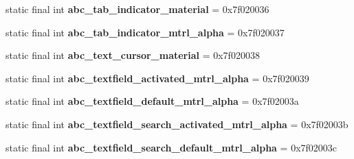 \begin{DoxyCompactItemize}
\item 
\hypertarget{classandroid_1_1support_1_1v7_1_1appcompat_1_1_r_1_1drawable_ad01fb974b00a197f97e18bda16585879}{}static final int {\bfseries abc\+\_\+tab\+\_\+indicator\+\_\+material} = 0x7f020036\label{classandroid_1_1support_1_1v7_1_1appcompat_1_1_r_1_1drawable_ad01fb974b00a197f97e18bda16585879}

\item 
\hypertarget{classandroid_1_1support_1_1v7_1_1appcompat_1_1_r_1_1drawable_a7f1049cbf557e1766067343e31d78efe}{}static final int {\bfseries abc\+\_\+tab\+\_\+indicator\+\_\+mtrl\+\_\+alpha} = 0x7f020037\label{classandroid_1_1support_1_1v7_1_1appcompat_1_1_r_1_1drawable_a7f1049cbf557e1766067343e31d78efe}

\item 
\hypertarget{classandroid_1_1support_1_1v7_1_1appcompat_1_1_r_1_1drawable_af136e33039ac3514baf9c234114932bb}{}static final int {\bfseries abc\+\_\+text\+\_\+cursor\+\_\+material} = 0x7f020038\label{classandroid_1_1support_1_1v7_1_1appcompat_1_1_r_1_1drawable_af136e33039ac3514baf9c234114932bb}

\item 
\hypertarget{classandroid_1_1support_1_1v7_1_1appcompat_1_1_r_1_1drawable_ae8bbef6c2b80b044a07e1d6780e06aff}{}static final int {\bfseries abc\+\_\+textfield\+\_\+activated\+\_\+mtrl\+\_\+alpha} = 0x7f020039\label{classandroid_1_1support_1_1v7_1_1appcompat_1_1_r_1_1drawable_ae8bbef6c2b80b044a07e1d6780e06aff}

\item 
\hypertarget{classandroid_1_1support_1_1v7_1_1appcompat_1_1_r_1_1drawable_a7c33f295eda00f089cb60a480e595b5e}{}static final int {\bfseries abc\+\_\+textfield\+\_\+default\+\_\+mtrl\+\_\+alpha} = 0x7f02003a\label{classandroid_1_1support_1_1v7_1_1appcompat_1_1_r_1_1drawable_a7c33f295eda00f089cb60a480e595b5e}

\item 
\hypertarget{classandroid_1_1support_1_1v7_1_1appcompat_1_1_r_1_1drawable_a00703e7605d149c1c96ba37e9a700fe0}{}static final int {\bfseries abc\+\_\+textfield\+\_\+search\+\_\+activated\+\_\+mtrl\+\_\+alpha} = 0x7f02003b\label{classandroid_1_1support_1_1v7_1_1appcompat_1_1_r_1_1drawable_a00703e7605d149c1c96ba37e9a700fe0}

\item 
\hypertarget{classandroid_1_1support_1_1v7_1_1appcompat_1_1_r_1_1drawable_a7f879ca4144a7a5c7ce00c1365719a05}{}static final int {\bfseries abc\+\_\+textfield\+\_\+search\+\_\+default\+\_\+mtrl\+\_\+alpha} = 0x7f02003c\label{classandroid_1_1support_1_1v7_1_1appcompat_1_1_r_1_1drawable_a7f879ca4144a7a5c7ce00c1365719a05}


\end{DoxyCompactItemize}
